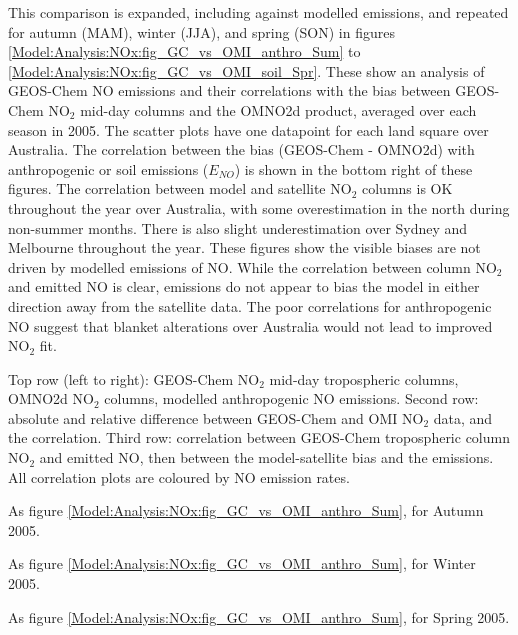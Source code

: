     This comparison is expanded, including against modelled emissions, and repeated for autumn (MAM), winter (JJA), and spring (SON) in figures \ref{Model:Analysis:NOx:fig_GC_vs_OMI_anthro_Sum} to \ref{Model:Analysis:NOx:fig_GC_vs_OMI_soil_Spr}.
    These show an analysis of GEOS-Chem NO emissions and their correlations with the bias between GEOS-Chem NO$_2$ mid-day columns and the OMNO2d product, averaged over each season in 2005.
    The scatter plots have one datapoint for each land square over Australia.
    The correlation between the bias (GEOS-Chem - OMNO2d) with anthropogenic or soil emissions ($E_{NO}$) is shown in the bottom right of these figures.    
    The correlation between model and satellite NO$_2$ columns is OK throughout the year over Australia, with some overestimation in the north during non-summer months.
    There is also slight underestimation over Sydney and Melbourne throughout the year.
    These figures show the visible biases are not driven by modelled emissions of NO.
    While the correlation between column NO$_2$ and emitted NO is clear, emissions do not appear to bias the model in either direction away from the satellite data.
    The poor correlations for anthropogenic NO suggest that blanket alterations over Australia would not lead to improved NO$_2$ fit. 
    
    {
      Top row (left to right): GEOS-Chem NO$_2$ mid-day tropospheric columns, OMNO2d NO$_2$ columns, modelled anthropogenic NO emissions. 
      Second row: absolute and relative difference between GEOS-Chem and OMI NO$_2$ data, and the correlation.
      Third row: correlation between GEOS-Chem tropospheric column NO$_2$ and emitted NO, then between the model-satellite bias and the emissions.
      All correlation plots are coloured by NO emission rates.
    }
    {\label{Model:Analysis:NOx:fig_GC_vs_OMI_anthro_Sum}}
    
    {As figure \ref{Model:Analysis:NOx:fig_GC_vs_OMI_anthro_Sum}, for Autumn 2005.}
    {\label{Model:Analysis:NOx:fig_GC_vs_OMI_anthro_Aut}}
    
    {As figure \ref{Model:Analysis:NOx:fig_GC_vs_OMI_anthro_Sum}, for Winter 2005.}
    {\label{Model:Analysis:NOx:fig_GC_vs_OMI_anthro_Win}}
    
    {As figure \ref{Model:Analysis:NOx:fig_GC_vs_OMI_anthro_Sum}, for Spring 2005.}
    {\label{Model:Analysis:NOx:fig_GC_vs_OMI_anthro_Spr}}
    
